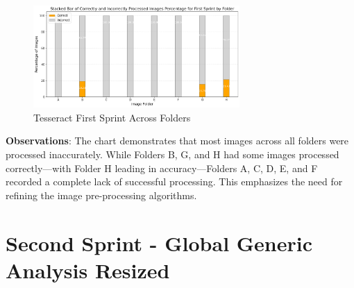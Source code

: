 \vspace{1in}



\begin{figure}[ht]
    \centering
    \includegraphics[width=0.7\textwidth]{Figures/Results/tesseract_sprints_one.png}
    \caption[Tesseract First Sprint Across Folders]{Tesseract First Sprint Across Folders}
    \label{fig:Tesseract First Sprint Across Folders}
\end{figure}

\vspace{1in}

\textbf{Observations}:
The chart demonstrates that most images across all folders were processed inaccurately. While Folders B, G, and H had some images processed correctly—with Folder H leading in accuracy—Folders A, C, D, E, and F recorded a complete lack of successful processing. This emphasizes the need for refining the image pre-processing algorithms.

\newpage

\section{Second Sprint - Global Generic Analysis Resized}


